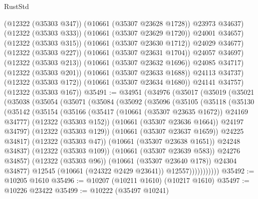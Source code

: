 \begin{lexlean}{RustStd}
\begin{coremodule}
                  (@12322 (@35303 @347))
                  (@10661 (@35307 @23628 @1728))
                  @23973
                  @34637)
                (@12322 (@35303 @333))
                (@10661 (@35307 @23629 @1720))
                @24001
                @34657)
              (@12322 (@35303 @315))
              (@10661 (@35307 @23630 @1712))
              @24029
              @34677)
            (@12322 (@35303 @227))
            (@10661 (@35307 @23631 @1704))
            @24057
            @34697)
          (@12322 (@35303 @213))
          (@10661 (@35307 @23632 @1696))
          @24085
          @34717)
        (@12322 (@35303 @201))
        (@10661 (@35307 @23633 @1688))
        @24113
        @34737)
      (@12322 (@35303 @172))
      (@10661 (@35307 @23634 @1680))
      @24141
      @34757)
    (@12322 (@35303 @167))
@35491 := @34951
    (@34976
      (@35017
        (@35019
          (@35021
            (@35038
              (@35054
                (@35071
                  (@35084
                    (@35092
                      (@35096
                        (@35105
                          (@35118
                            (@35130
                              (@35142
                                (@35154
                                  (@35166
                                    (@35417 (@10661 (@35307 @23635 @1672)) @24169 @34777)
                                    (@12322 (@35303 @152))
                                    (@10661 (@35307 @23636 @1664))
                                    @24197
                                    @34797)
                                  (@12322 (@35303 @129))
                                  (@10661 (@35307 @23637 @1659))
                                  @24225
                                  @34817)
                                (@12322 (@35303 @47))
                                (@10661 (@35307 @23638 @1651))
                                @24248
                                @34837)
                              (@12322 (@35303 @109))
                              (@10661 (@35307 @23639 @583))
                              @24276
                              @34857)
                            (@12322 (@35303 @96))
                            (@10661 (@35307 @23640 @178))
                            @24304
                            @34877)
                          @12545
                          (@10661 (@24322 @2429 @23641))
                          @12557)))))))))))
@35492 := @10205 @1610
@35496 := @10207 (@10211 @1610) (@10217 @1610)
@35497 := @10226 @23422
@35499 := @10222 (@35497 @10241)

\end{coremodule}
\end{lexlean}
